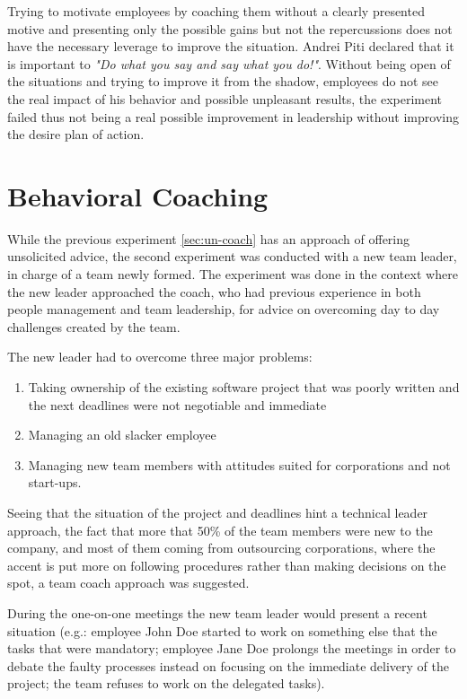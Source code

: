 Trying to motivate employees by coaching them without a clearly presented motive and presenting only the possible gains but not the repercussions does not have the necessary leverage to improve the situation. Andrei Piti declared that it is important to \textit{"Do what you say and say what you do!"}. Without being open of the situations and trying to improve it from the shadow, employees do not see the real impact of his behavior and possible unpleasant results, the experiment failed thus not being a real possible improvement in leadership without improving the desire plan of action.

\section{Behavioral Coaching}
\label{sec:beh-coach}

While the previous experiment \ref{sec:un-coach} has an approach of offering unsolicited advice, the second experiment was conducted with a new team leader, in charge of a team newly formed. The experiment was done in the context where the new leader approached the coach, who had previous experience in both people management and team leadership, for advice on overcoming day to day challenges created by the team. 

The new leader had to overcome three major problems:
\begin{enumerate}
\item Taking ownership of the existing software project that was poorly written and the next deadlines were not negotiable and immediate
\item Managing an old slacker employee
\item Managing new team members with attitudes suited for corporations and not start-ups.
\end{enumerate}

Seeing that the situation of the project and deadlines hint a technical leader approach, the fact that more that 50\% of the team members were new to the company, and most of them coming from outsourcing corporations, where the accent is put more on following procedures rather than making decisions on the spot, a team coach approach was suggested.

During the one-on-one meetings the new team leader would present a recent situation (e.g.: employee John Doe started to work on something else that the tasks that were mandatory; employee Jane Doe prolongs the meetings in order to debate the faulty processes instead on focusing on the immediate delivery of the project; the team refuses to work on the delegated tasks).

